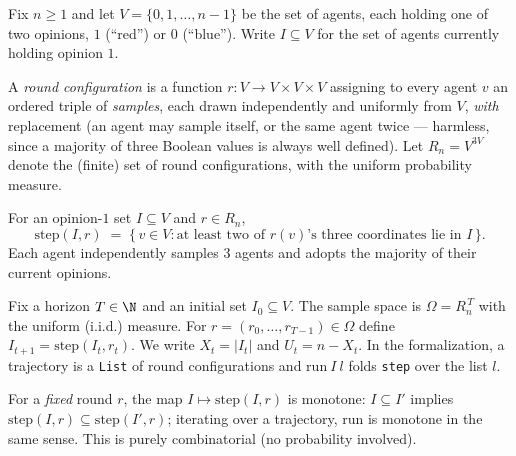 Fix $n \ge 1$ and let $V = \{0,1,\dots,n-1\}$ be the set of agents, each
holding one of two opinions, $1$ (``red'') or $0$ (``blue''). Write
$I \subseteq V$ for the set of agents currently holding opinion $1$.

\begin{definition}\label{def:round}
  \leanok
  A \emph{round configuration} is a function $r \colon V \to V \times V
  \times V$ assigning to every agent $v$ an ordered triple of \emph{samples},
  each drawn independently and uniformly from $V$, \emph{with} replacement
  (an agent may sample itself, or the same agent twice --- harmless, since a
  majority of three Boolean values is always well defined). Let
  $R_n = V^{3V}$ denote the (finite) set of round configurations, with the
  uniform probability measure.
\end{definition}

\begin{definition}\label{def:step}
  \leanok
  For an opinion-$1$ set $I \subseteq V$ and $r \in R_n$,
  \[
    \mathrm{step}(I,r) \;=\; \{\, v \in V : \text{at least two of } r(v)\text{'s three
    coordinates lie in } I \,\}.
  \]
  Each agent independently samples $3$ agents and adopts the majority of
  their current opinions.
\end{definition}

\begin{definition}[Process]\label{def:process}
  \leanok
  Fix a horizon $T \in \N$ and an initial set $I_0 \subseteq V$. The sample
  space is $\Omega = R_n^{\,T}$ with the uniform (i.i.d.) measure. For
  $r = (r_0,\dots,r_{T-1}) \in \Omega$ define $I_{t+1} =
  \mathrm{step}(I_t, r_t)$. We write $X_t = |I_t|$ and $U_t = n - X_t$. In
  the formalization, a trajectory is a \texttt{List} of round configurations
  and $\mathrm{run}\ I\ l$ folds \texttt{step} over the list $l$.
\end{definition}

\begin{lemma}\label{lem:mono}
  \leanok
  For a \emph{fixed} round $r$, the map $I \mapsto \mathrm{step}(I,r)$ is
  monotone: $I \subseteq I'$ implies $\mathrm{step}(I,r) \subseteq
  \mathrm{step}(I',r)$; iterating over a trajectory, $\mathrm{run}$ is
  monotone in the same sense. This is purely combinatorial (no probability
  involved).
\end{lemma}

